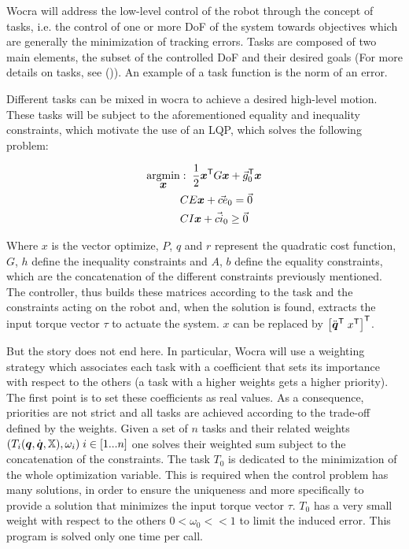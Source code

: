 Wocra will address the low-\/level control of the robot through the concept of tasks, i.\+e. the control of one or more DoF of the system towards objectives which are generally the minimization of tracking errors. Tasks are composed of two main elements, the subset of the controlled DoF and their desired goals (For more details on tasks, see ()). An example of a task function is the norm of an error.

Different tasks can be mixed in wocra to achieve a desired high-\/level motion. These tasks will be subject to the aforementioned equality and inequality constraints, which motivate the use of an L\+QP, which solves the following problem\+:

\begin{align*} \underset{\mbox{\boldmath${x}$}}{\operatorname{argmin}} &: \; \frac{1}{2} \mbox{\boldmath${x}$}^{\mathsf{T}} G \mbox{\boldmath${x}$} + \vec{g}_0^{\mathsf{T}} \mbox{\boldmath${x}$} \\ & CE \mbox{\boldmath${x}$} + \vec{ce}_0 = \vec{0} \\ & CI \mbox{\boldmath${x}$} + \vec{ci}_0 \geq \vec{0} \end{align*}

Where $ x $ is the vector optimize, $ P $, $ q $ and $ r $ represent the quadratic cost function, $ G $, $ h $ define the inequality constraints and $ A $, $ b $ define the equality constraints, which are the concatenation of the different constraints previously mentioned. The controller, thus builds these matrices according to the task and the constraints acting on the robot and, when the solution is found, extracts the input torque vector $ \tau $ to actuate the system. $ x $ can be replaced by $ \left[ \ddot{\mbox{\boldmath${q}$}} ^{\mathsf{T}} \; x ^{\mathsf{T}} \right] ^{\mathsf{T}} $.

But the story does not end here. In particular, Wocra will use a weighting strategy which associates each task with a coefficient that sets its importance with respect to the others (a task with a higher weights gets a higher priority). The first point is to set these coefficients as real values. As a consequence, priorities are not strict and all tasks are achieved according to the trade-\/off defined by the weights. Given a set of $ n $ tasks and their related weights $ (T_i(\mbox{\boldmath${q}$}, \dot{\mbox{\boldmath${q}$}}, \mathbb{X}), \omega_i) \; i \in [1...n] $ one solves their weighted sum subject to the concatenation of the constraints. The task $ T_0 $ is dedicated to the minimization of the whole optimization variable. This is required when the control problem has many solutions, in order to ensure the uniqueness and more specifically to provide a solution that minimizes the input torque vector $ \tau $. $ T_0 $ has a very small weight with respect to the others $ 0 < \omega_0 << 1 $ to limit the induced error. This program is solved only one time per call.

